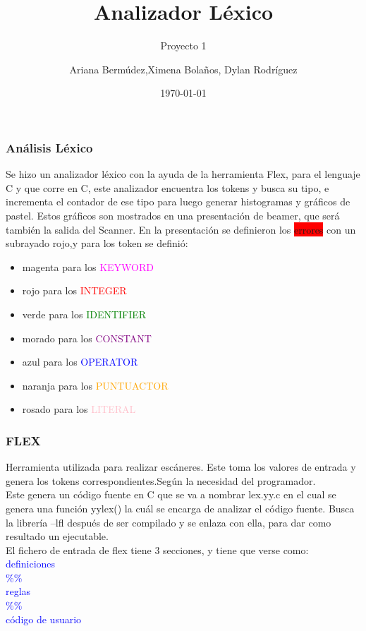 \documentclass{beamer}
\title{Analizador L\'exico}
\subtitle{Proyecto 1}
\author{Ariana Berm\'udez,Ximena Bola\~nos, Dylan Rodr\'iguez}
\institute{Instituto Tecnol\'ogico de Costa Rica}
\date{\today}
\begin{document}
\begin{frame}
 \titlepage 
 \end{frame}\begin{frame}
 \frametitle{An\'alisis L\'exico}
 Se hizo un analizador l\'exico con la ayuda de la herramienta Flex, para el lenguaje C y que corre en C, este analizador encuentra los tokens y busca su tipo, e incrementa el contador de ese tipo para luego generar histogramas y gr\'aficos de pastel. Estos gr\'aficos son mostrados en una presentaci\'on de beamer, que ser\'a tambi\'en la salida del Scanner. En la presentaci\'on se definieron los \colorbox{red}{errores} con un subrayado rojo,y para los token se defini\'o:\begin{itemize} \item magenta para los \textcolor{magenta} {KEYWORD}  \item rojo para los \textcolor{red}{INTEGER} \item verde para los \textcolor{green} {IDENTIFIER} \item morado para los \textcolor{purple}{CONSTANT} \item azul para los \textcolor{blue} {OPERATOR} \item naranja para los \textcolor{orange} {PUNTUACTOR} \item rosado para los \textcolor{pink} {LITERAL} \end{itemize} \end{frame}\begin{frame}
 \frametitle{FLEX}
 Herramienta utilizada para realizar esc\'aneres. Este toma los valores de entrada y genera los tokens correspondientes.Seg\'un la necesidad del programador. \\ Este genera un c\'odigo fuente en C que se va a nombrar lex.yy.c en el cual se genera una funci\'on yylex() la cu\'al se encarga de analizar el c\'odigo fuente. Busca la librer\'ia –lfl después de ser compilado y se enlaza con ella, para dar como resultado un ejecutable. \\ 
 El fichero de entrada de flex tiene 3 secciones, y tiene que verse como:\\ 
 \textcolor{blue}{definiciones \\ \%\% \\ reglas \\ \%\% \\ c\'odigo de usuario} \\ 
\end{frame}
\end{document}
